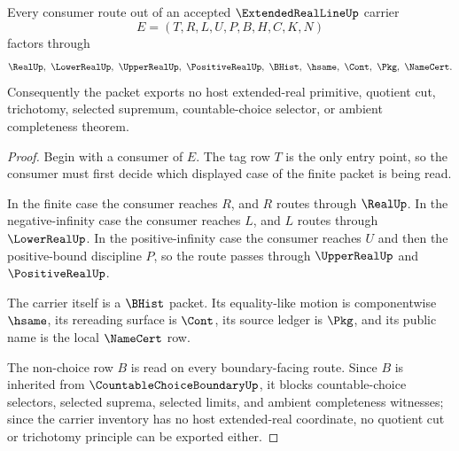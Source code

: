 \begin{theorem}
\label{thm:extended-real-line-finite-boundary}
Every consumer route out of an accepted $\ExtendedRealLineUp$ carrier
$$
E=(T,R,L,U,P,B,H,C,K,N)
$$
factors through
$$
\RealUp,\ \LowerRealUp,\ \UpperRealUp,\ \PositiveRealUp,\ \BHist,\ \hsame,\ \Cont,\ \Pkg,\ \NameCert .
$$
Consequently the packet exports no host extended-real primitive, quotient cut, trichotomy, selected supremum, countable-choice selector, or ambient completeness theorem.
\end{theorem}
\begin{proof}
Begin with a consumer of $E$. The tag row $T$ is the only entry point, so the consumer must first decide which displayed case of the finite packet is being read.

In the finite case the consumer reaches $R$, and $R$ routes through $\RealUp$. In the negative-infinity case the consumer reaches $L$, and $L$ routes through $\LowerRealUp$. In the positive-infinity case the consumer reaches $U$ and then the positive-bound discipline $P$, so the route passes through $\UpperRealUp$ and $\PositiveRealUp$.

The carrier itself is a $\BHist$ packet. Its equality-like motion is componentwise $\hsame$, its rereading surface is $\Cont$, its source ledger is $\Pkg$, and its public name is the local $\NameCert$ row.

The non-choice row $B$ is read on every boundary-facing route. Since $B$ is inherited from $\CountableChoiceBoundaryUp$, it blocks countable-choice selectors, selected suprema, selected limits, and ambient completeness witnesses; since the carrier inventory has no host extended-real coordinate, no quotient cut or trichotomy principle can be exported either.
\end{proof}


